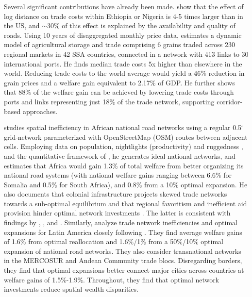 \documentclass[a4paper]{article}
\begin{document}
Several significant contributions have already been made. \citet{atkin2015s} show that the effect of log distance on trade costs within Ethiopia or Nigeria is 4-5 times larger than in the US, and $\sim$30\% of this effect is explained by the availability and quality of roads. Using 10 years of disaggregated monthly price data, \citet{porteous2019high} estimates a dynamic model of agricultural storage and trade comprising 6 grains traded across 230 regional markets in 42 SSA countries, connected in a network with 413 links to 30 international ports. He finds median trade costs 5x higher than elsewhere in the world. Reducing trade costs to the world average would yield a 46\% reduction in grain prices and a welfare gain equivalent to 2.17\% of GDP. He further shows that 88\% of the welfare gain can be achieved by lowering trade costs through ports and links representing just 18\% of the trade network, supporting corridor-based approaches. \newline 

\citet{graff2019spatial} studies spatial inefficiency in African national road networks using a regular 0.5$^\circ$ grid-network parameterized with OpenStreetMap (OSM) routes between adjacent cells. Employing data on population, nightlights (productivity) and ruggedness \citep{nunn2012ruggedness}, and the quantitative framework of \citet{fajgelbaum2020optimal}, he generates ideal national networks, and estimates that Africa would gain 1.3\% of total welfare from better organizing its national road systems (with national welfare gains ranging between 6.6\% for Somalia and 0.5\% for South Africa), and 0.8\% from a 10\% optimal expansion. He also documents that colonial infrastructure projects skewed trade networks towards a sub-optimal equilibrium and that regional favoritism and inefficient aid provision hinder optimal network investments \citep{graff2019spatial}. The latter is consistent with findings by \citet{jedwab2016permanent, jedwab2017history}, \citet{burgess2015value}, and \citet{bonfatti2019priority}. Similarly, \citet{gorton2022trade} analyze trade network inefficiencies and optimal expansions for Latin America closely following \citet{fajgelbaum2020optimal}. They find average welfare gains of 1.6\% from optimal reallocation and 1.6\%/1\% from a 50\%/10\% optimal expansion of national road networks. They also consider transnational networks in the MERCOSUR and Andean Community trade blocs. Disregarding borders, they find that optimal expansions better connect major cities across countries at welfare gains of 1.5\%-1.9\%. Throughout, they find that optimal network investments reduce spatial wealth disparities. \newline
\end{document}
